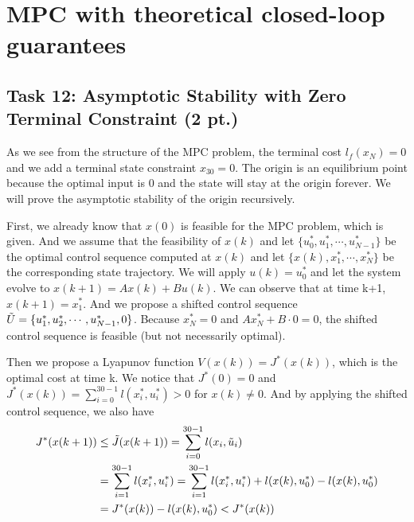 \documentclass[a4paper,twoside,11pt]{article}
\numberwithin{equation}{section}
\begin{document}
\newpage


\section{MPC with theoretical closed-loop guarantees}

\subsection{Task 12: Asymptotic Stability with Zero Terminal Constraint (2 pt.)}

As we see from the structure of the MPC problem, the terminal cost $l_f(x_N) = 0$ and we add a terminal state constraint $x_{30} = 0$. The origin is an equilibrium point because the optimal input is 0 and the state will stay at the origin forever. We will prove the asymptotic stability of the origin recursively. 

First, we already know that $x(0)$ is feasible for the MPC problem, which is given. And we assume that the feasibility of $x(k)$ and let $\{u^*_0, u^*_1, \cdots, u^*_{N-1}\}$ be the optimal control sequence computed at $x(k)$ and let $\{x(k), x_1^*, \cdots, x_N^*\}$ be the corresponding state trajectory. We will apply $u(k) = u^*_0$ and let the system evolve to $x(k+1) = Ax(k)+Bu(k)$. We can observe that at time k+1, $x(k+1) = x_1^*$. And we propose a shifted control sequence $\Tilde{U} = \{u^*_1, u^*_2, \cdots, u^*_{N-1}, 0\}$. Because $x^*_N = 0$ and $Ax^*_N+B\cdot 0 =0$, the shifted control sequence is feasible (but not necessarily optimal). 

Then we propose a Lyapunov function $V(x(k)) = J^*(x(k))$, which is the optimal cost at time k. We notice that $J^*(0) = 0$ and $J^*(x(k)) = \sum_{i = 0}^{30-1}l(x_i^*, u_i^*)>0$ for $x(k) \neq 0$. And by applying the shifted control sequence, we also have
\begin{equation*}
    \begin{split}
        J^*(x(k+1)) & \le \Tilde{J}(x(k+1)) = \sum_{i = 0}^{30-1}l(x_i, \Tilde{u}_i) \\
                    & = \sum_{i = 1}^{30-1}l(x_i^*, u_i^*) = \sum_{i = 1}^{30-1}l(x_i^*, u_i^*) + l(x(k), u_0^*) - l(x(k), u_0^*) \\
                    & = J^*(x(k)) - l(x(k), u_0^*) < J^*(x(k))
    \end{split}
\end{equation*}
\end{document}
